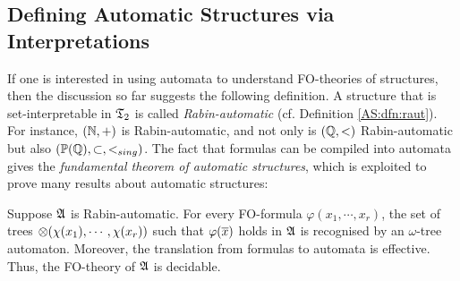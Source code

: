 
\subsection{Defining Automatic Structures via Interpretations}
If one is interested in using automata to understand FO-theories of structures, then the discussion so far suggests the following definition. 
A structure that is set-interpretable in $\mathfrak{T}_2$ is called {\em Rabin-automatic} (cf. Definition \ref{AS:dfn:raut}). For instance, 
$(\mathbb{N},+)$ is Rabin-automatic, and not only is $(\mathbb{Q},<)$ Rabin-automatic but also $({\mathbb P}(\mathbb{Q}),\subset,<_{sing})$.
The fact that formulas can be compiled into automata gives the {\em fundamental theorem of automatic structures}, which is 
exploited to prove many results about automatic structures:


\begin{theorem} \label{AS:thm:fundthm}
Suppose $\mathfrak{A}$ is Rabin-automatic. For every FO-formula $\varphi(x_1,\cdots,x_r)$, the set of trees $\otimes(\chi(x_1), \cdots, \chi(x_r))$ such that 
$\varphi(\mbox{$\overline {x}$})$ holds in $\mathfrak{A}$ is recognised by an $\omega$-tree automaton. Moreover, the translation from formulas to automata is effective. 
Thus, the FO-theory of $\mathfrak{A}$ is decidable.
\end{theorem}







